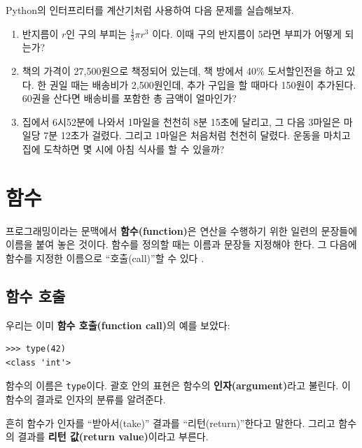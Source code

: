 \documentclass[10pt]{book}
\begin{document}
\begin{exercise}

Python의 인터프리터를 계산기처럼 사용하여 다음 문제를 실습해보자.

\begin{enumerate}

\item 반지름이 $r$인 구의 부피는 $\frac{4}{3} \pi r^3$ 이다.  이때 구의
  반지름이 5라면 부피가 어떻게 되는가?

\item 책의 가격이 27,500원으로 책정되어 있는데, 책 방에서 40\%
  도서할인전을 하고 있다. 한 권일 때는 배송비가 2,500원인데, 추가
  구입을 할 때마다 150원이 추가된다.  60권을 산다면 배송비를 포함한 총
  금액이 얼마인가?


\item 집에서 6시52분에 나와서 1마일을 천천히 8분 15초에 달리고, 그 다음
  3마일은 마일당 7분 12초가 걸렸다. 그리고 1마일은 처음처럼 천천히
  달렸다.  운동을 마치고 집에 도착하면 몇 시에 아침 식사를 할 수
  있을까?

\end{enumerate}
\end{exercise}


\chapter{함수}
\label{funcchap}

프로그래밍이라는 문맥에서 {\bf 함수(function)}은 연산을 수행하기 위한
일련의 문장들에 이름을 붙여 놓은 것이다.  함수를 정의할 때는 이름과
문장들 지정해야 한다.  그 다음에 함수를 지정한 이름으로
``호출(call)''할 수 있다 .

\section{함수 호출}
\label{functionchap}

우리는 이미 {\bf 함수 호출(function call)}의 예를 보았다: 

\begin{verbatim}
>>> type(42)
<class 'int'>
\end{verbatim}
%
함수의 이름은 {\tt type}이다.  괄호 안의 표현은 함수의 {\bf
  인자(argument)}라고 불린다.  이 함수의 결과로 인자의 분류를
알려준다.

흔히 함수가 인자를 ``받아서(take)'' 결과를 ``리턴(return)''한다고
말한다.  그리고 함수의 결과를 {\bf 리턴 값(return value)}이라고
부른다.
\end{document}
